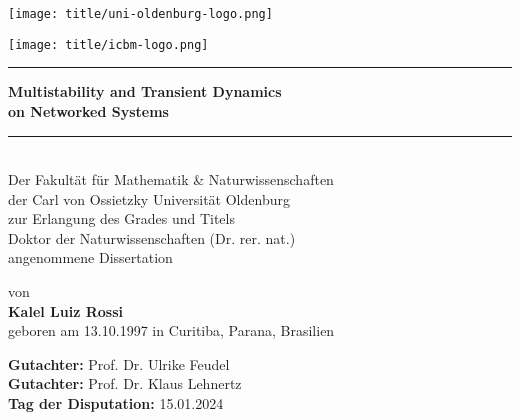 \begin{titlepage}
    \centering
    \begin{minipage}{0.4\textwidth}
        \centering
        \texttt{[image: title/uni-oldenburg-logo.png]}  %
    \end{minipage}
    \hfill
    \begin{minipage}{0.4\textwidth}
        \centering
        \texttt{[image: title/icbm-logo.png]}  %
    \end{minipage}
    
    \vspace*{2.0cm}
    {
        \noindent\rule{\textwidth}{0.4mm}  %
    \vspace{0.4cm}
    \huge \textbf{Multistability and Transient Dynamics \\[0.25cm] on Networked Systems}
    \vspace{0.4cm}
    \noindent\rule{\textwidth}{0.4mm}  %
    }
    \\[2.2cm]  %
    
    
    \vspace*{2.8cm}  %
    {\large Der Fakultät für Mathematik \& Naturwissenschaften \\[0.25cm]
    der Carl von Ossietzky Universität Oldenburg \\[0.25cm]
    zur Erlangung des Grades und Titels \\[0.25cm]
    Doktor der Naturwissenschaften (Dr. rer. nat.) \\[0.25cm]
    angenommene Dissertation}
    
	\vfill
    {\large von \\[0.28cm]
    \textbf{Kalel Luiz Rossi} \\[0.28cm]
    geboren am 13.10.1997 in Curitiba, Parana, Brasilien}
    
    
\end{titlepage}

\newpage  %


\vspace*{\fill}  %
\begin{flushleft}
	\large
    \textbf{Gutachter:} Prof. Dr. Ulrike Feudel  \\[0.2cm]
    \textbf{Gutachter:} Prof. Dr. Klaus Lehnertz \\[0.2cm]
    \textbf{Tag der Disputation:} 15.01.2024
\end{flushleft}

\newpage  %